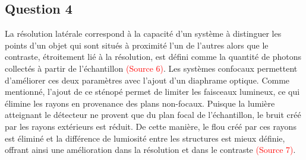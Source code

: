 \documentclass[11pt,letterpaper]{article}
\begin{document}

\subsection{Question 4}
La résolution latérale correspond à la capacité d'un système à distinguer les points d'un objet qui sont situés à proximité l'un de l'autres alors que le contraste, étroitement lié à la résolution, est défini comme la quantité de photons collectés à partir de l'échantillon \textcolor{red}{(Source 6)}. Les systèmes confocaux permettent d'améliorer ces deux paramètres avec l'ajout d'un diaphrame optique. Comme mentionné, l'ajout de ce sténopé permet de limiter les faisceaux lumineux, ce qui élimine les rayons en provenance des plans non-focaux. Puisque la lumière atteignant le détecteur ne provent que du plan focal de l'échantillon, le bruit créé par les rayons extérieurs est réduit. De cette manière, le flou créé par ces rayons est éliminé et la différence de lumiosité entre les structures est mieux définie, offrant ainsi une amélioration dans la résolution et dans le contraste \textcolor{red}{(Source 7)}.
\end{document}
